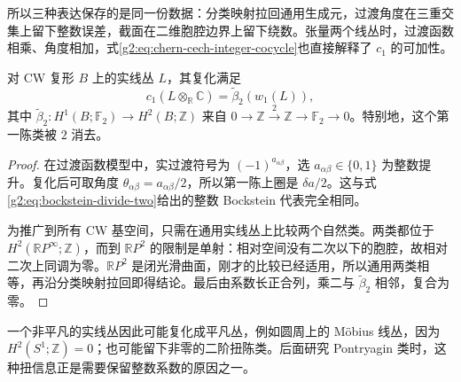 所以三种表达保存的是同一份数据：分类映射拉回通用生成元，过渡角度在三重交集上留下整数误差，截面在二维胞腔边界上留下绕数。张量两个线丛时，过渡函数相乘、角度相加，式\eqref{g2:eq:chern-cech-integer-cocycle}也直接解释了 \(c_1\) 的可加性。

\begin{proposition}\label{g2:prop:real-line-complexification-bockstein}
	对 CW 复形 \(B\) 上的实线丛 \(L\)，其复化满足
	\begin{equation}\label{g2:eq:line-complexification-bockstein}
		c_1(L\otimes_{\mathbb R}\mathbb C)=\widetilde\beta_2(w_1(L)),
	\end{equation}
	其中 \(\widetilde\beta_2:H^1(B;\mathbb F_2)\to H^2(B;\mathbb Z)\) 来自 \(0\to\mathbb Z\xrightarrow{2}\mathbb Z\to\mathbb F_2\to0\)。特别地，这个第一陈类被 \(2\) 消去。
\end{proposition}
\begin{proof}
	在过渡函数模型中，实过渡符号为 \((-1)^{a_{\alpha\beta}}\)，选 \(a_{\alpha\beta}\in\{0,1\}\) 为整数提升。复化后可取角度 \(\theta_{\alpha\beta}=a_{\alpha\beta}/2\)，所以第一陈上圈是 \(\delta a/2\)。这与式\eqref{g2:eq:bockstein-divide-two}给出的整数 Bockstein 代表完全相同。

	为推广到所有 CW 基空间，只需在通用实线丛上比较两个自然类。两类都位于 \(H^2(\mathbb RP^\infty;\mathbb Z)\)，而到 \(\mathbb RP^2\) 的限制是单射：相对空间没有二次以下的胞腔，故相对二次上同调为零。\(\mathbb RP^2\) 是闭光滑曲面，刚才的比较已经适用，所以通用两类相等，再沿分类映射拉回即得结论。最后由系数长正合列，乘二与 \(\widetilde\beta_2\) 相邻，复合为零。
\end{proof}

一个非平凡的实线丛因此可能复化成平凡丛，例如圆周上的 Möbius 线丛，因为 \(H^2(S^1;\mathbb Z)=0\)；也可能留下非零的二阶扭陈类。后面研究 Pontryagin 类时，这种扭信息正是需要保留整数系数的原因之一。
